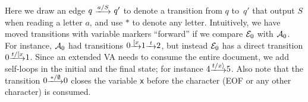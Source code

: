 \begin{example}
\begin{center}
\end{center}
Here we draw an edge $q \ \longtrans{a / S} \ q'$ to denote a transition from $q$ to~$q'$ that output $S$ when reading a letter $a$, and use $*$ to denote any letter. Intuitively, we have moved transitions with variable markers ``forward'' if we compare $\mathcal{E}_0$ with $\mathcal{A}_0$.  For instance, $\mathcal{A}_0$ had transitions $0 \trans{\Open{x}} 1 \trans{t} 2$, but instead $\mathcal{E}_0$ has a  direct transition $0 \longtrans{t/\Open{x}} 1$.  Since an extended VA needs to consume the entire document, we add self-loops in the initial and the final state; for instance $4 \longtrans{t/\Close{x}} 5$. Also note that the transition $0 \longtrans{*/\emptyset} 0$ closes the variable \texttt{x} before the character (\textsf{EOF} or any other character) is consumed.
\end{example}

